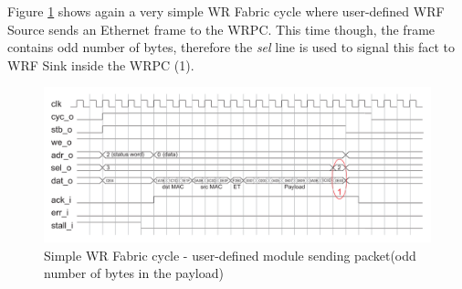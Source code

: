 Figure \ref{fig:fabric:sel} shows again a very simple WR Fabric cycle where
user-defined WRF Source sends an Ethernet frame to the WRPC. This time though,
the frame contains odd number of bytes, therefore the \emph{sel} line is used to
signal this fact to WRF Sink inside the WRPC (1).

\begin{figure}[ht]
  \begin{center}
    \includegraphics[width=\textwidth]{fig/basic_wrf_cycle_sel.pdf}
    \caption{Simple WR Fabric cycle - user-defined module sending packet(odd
    number of bytes in the payload)}
    \label{fig:fabric:sel}
  \end{center}
\end{figure}

